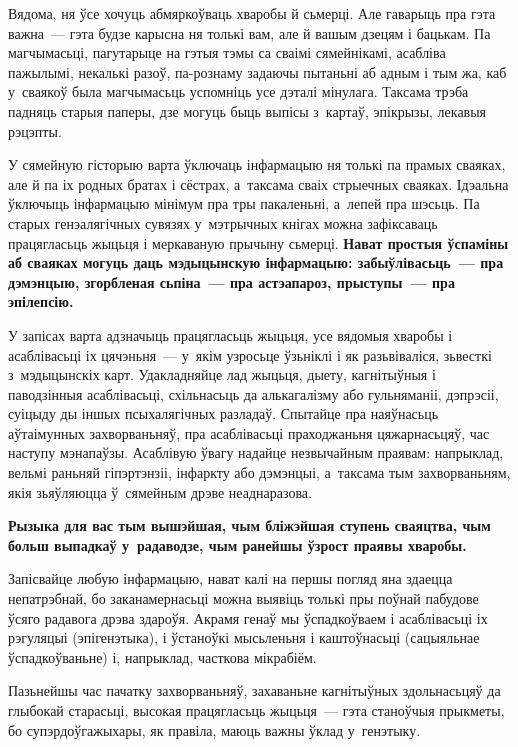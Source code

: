 Вядома, ня ўсе хочуць абмяркоўваць хваробы й сьмерці. Але гаварыць пра гэта важна~--- гэта будзе карысна ня толькі вам, але й вашым дзецям і бацькам. Па магчымасьці, пагутарыце на гэтыя тэмы са сваімі сямейнікамі, асабліва пажылымі, некалькі разоў, па-рознаму задаючы пытаньні аб адным і тым жа, каб у~сваякоў была магчымасьць успомніць усе дэталі мінулага. Таксама трэба падняць старыя паперы, дзе могуць быць выпісы з~картаў, эпікрызы, лекавыя рэцэпты.

У сямейную гісторыю варта ўключаць інфармацыю ня толькі па прамых сваяках, але й па іх родных братах і сёстрах, а~таксама сваіх стрыечных сваяках. Ідэальна ўключыць інфармацыю мінімум пра тры пакаленьні, а~лепей пра шэсьць. Па старых генэалягічных сувязях у~мэтрычных кнігах можна зафіксаваць працягласьць жыцьця і меркаваную прычыну сьмерці. \textbf{Нават простыя ўспаміны аб сваяках могуць даць мэдыцынскую інфармацыю: забыўлівасьць~--- пра дэмэнцыю, згорбленая сьпіна~--- пра астэапароз, прыступы~--- пра эпілепсію.}

У запісах варта адзначыць працягласьць жыцьця, усе вядомыя хваробы і асаблівасьці іх цячэньня~--- у~якім узросьце ўзьніклі і як разьвіваліся, зьвесткі з~мэдыцынскіх карт. Удакладняйце лад жыцьця, дыету, кагнітыўныя і паводзінныя асаблівасьці, схільнасьць да алькагалізму або гульняманіі, дэпрэсіі, суіцыду ды іншых псыхалягічных разладаў. Спытайце пра наяўнасьць аўтаімунных захворваньняў, пра асаблівасьці праходжаньня цяжарнасьцяў, час наступу мэнапаўзы. Асаблівую ўвагу надайце незвычайным праявам: напрыклад, вельмі раньняй гіпэртэнзіі, інфаркту або дэмэнцыі, а~таксама тым захворваньням, якія зьяўляюцца ў~сямейным дрэве неаднаразова.


\textbf{Рызыка для вас тым вышэйшая, чым бліжэйшая ступень сваяцтва, чым больш выпадкаў у~радаводзе, чым ранейшы ўзрост праявы хваробы.}

Запісвайце любую інфармацыю, нават калі на першы погляд яна здаецца непатрэбнай, бо заканамернасьці можна выявіць толькі пры поўнай пабудове ўсяго радавога дрэва здароўя. Акрамя генаў мы ўспадкоўваем і асаблівасьці іх рэгуляцыі (эпігенэтыка), і ўстаноўкі мысьленьня і каштоўнасьці (сацыяльнае ўспадкоўваньне) і, напрыклад, часткова мікрабіём.

Пазьнейшы час пачатку захворваньняў, захаваньне кагнітыўных здольнасьцяў да глыбокай старасьці, высокая працягласьць жыцьця~--- гэта станоўчыя прыкметы, бо супэрдоўгажыхары, як правіла, маюць важны ўклад у~генэтыку.

